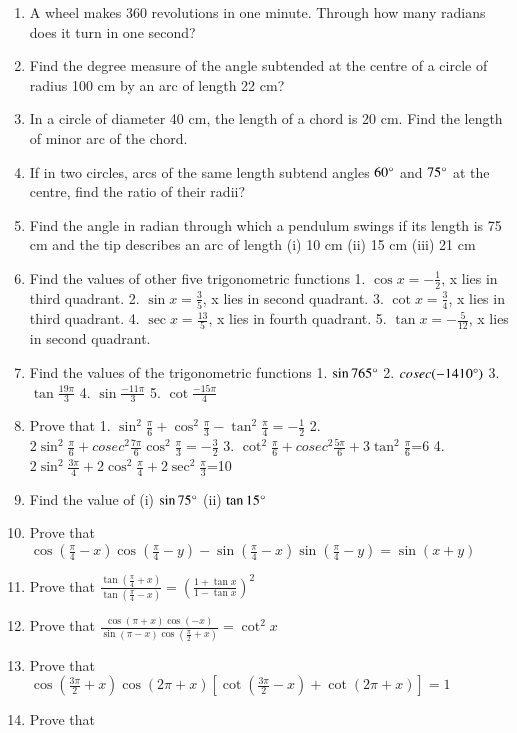 \begin{enumerate}[label=\thesubsection.\arabic*.,ref=\thesubsection.\theenumi,itemsep=1ex]
(i) $\frac{11}{16}$
(ii) -4
(iii) $\frac{5\pi}{3}$
(iv) $\frac{7\pi}{6}$
%
\item A wheel makes 360 revolutions in one minute. Through how many radians does it turn in one second?
%
\item Find the degree measure of the angle subtended at the centre of a circle of radius 100 cm by an arc of length 22 cm?
%
\item In a circle of diameter 40 cm, the length of a chord is 20 cm. Find the length of minor arc of the chord.
%
\item If in two circles, arcs of the same length subtend angles $60\degree$ and $75\degree$ at the centre, find the ratio of their radii?
%
\item Find the angle in radian through which a pendulum swings if its length is 75 cm and the tip describes an arc of length
(i) 10 cm
(ii) 15 cm
(iii) 21 cm
%
\item Find the values of other five trigonometric functions 
1. $\cos x=-\frac{1}{2}$, x lies in third quadrant.
2. $\sin x= \frac{3}{5}$, x lies in second quadrant.
3. $\cot x= \frac{3}{4}$, x lies in third quadrant.
4. $\sec x= \frac{13}{5}$, x lies in fourth quadrant.
5. $\tan x=-\frac{5}{12}$, x lies in second quadrant.
%
\item Find the values of the trigonometric functions
1. $\sin765\degree$
2. $cosec(-1410\degree)$
3. $\tan\frac{19\pi}{3}$
4. $\sin\frac{-11\pi}{3}$
5. $\cot\frac{-15\pi}{4}$
%
\item Prove that
1. $\sin^{2}\frac{\pi}{6}+\cos^{2}\frac{\pi}{3}-\tan^{2}\frac{\pi}{4}=-\frac{1}{2}$
2. $2\sin^{2}\frac{\pi}{6}+cosec^{2}\frac{7\pi}{6}\cos^{2}\frac{\pi}{3}=-\frac{3}{2}$
3. $\cot^{2}\frac{\pi}{6}+cosec^{2}\frac{5\pi}{6}+3\tan^{2}\frac{\pi}{6}$=6
4. $2\sin^{2}\frac{3\pi}{4}+2\cos^{2}\frac{\pi}{4}+2\sec^{2}\frac{\pi}{3}$=10
%
\item Find the value of
(i) $\sin75\degree$
(ii) $\tan15\degree$
%
\item Prove that 
 $\cos(\frac{\pi}{4}-x)\cos(\frac{\pi}{4}-y)-\sin(\frac{\pi}{4}-x)\sin(\frac{\pi}{4}-y)=\sin(x+y)$
%
\item Prove that 
$\frac{\tan(\frac{\pi}{4}+x)}{\tan(\frac{\pi}{4}-x)}=(\frac{1+\tan x}{1-\tan x})^{2}$
%
\item Prove that
$\frac{\cos(\pi+x)\cos(-x)}{\sin(\pi-x)\cos(\frac{\pi}{2}+x)}=\cot^{2}x$
%
\item Prove that
$\cos(\frac{3\pi}{2}+x)\cos(2\pi+x)[\cot(\frac{3\pi}{2}-x)+\cot(2\pi +x)]=1$
%
\item Prove that

\end{enumerate}
